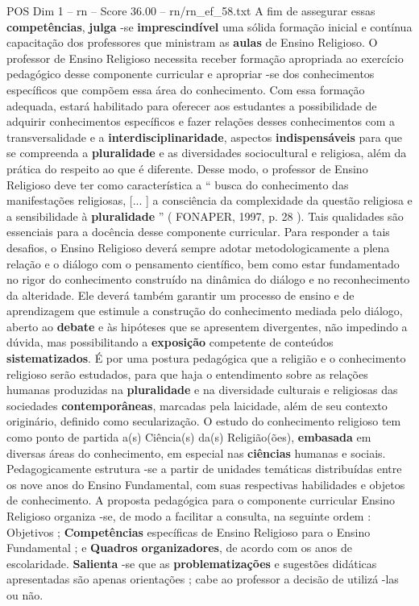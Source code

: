 \begin{textsample}{POS Dim 1 – rn – Score 36.00 – rn/rn\_ef\_58.txt}
A fim de assegurar essas \textbf{competências}, \textbf{julga} -se \textbf{imprescindível} uma sólida formação inicial e contínua capacitação dos professores que ministram as \textbf{aulas} de Ensino Religioso.
O professor de Ensino Religioso necessita receber formação apropriada ao exercício pedagógico desse componente curricular e apropriar -se dos conhecimentos específicos que compõem essa área do conhecimento.
Com essa formação adequada, estará habilitado para oferecer aos estudantes a possibilidade de adquirir conhecimentos específicos e fazer relações desses conhecimentos com a transversalidade e a \textbf{interdisciplinaridade}, aspectos \textbf{indispensáveis} para que se compreenda a \textbf{pluralidade} e as diversidades sociocultural e religiosa, além da prática do respeito ao que é diferente.
Desse modo, o professor de Ensino Religioso deve ter como característica a “ busca do conhecimento das manifestações religiosas, [... ] a consciência da complexidade da questão religiosa e a sensibilidade à \textbf{pluralidade} ” ( FONAPER, 1997, p. 28 ).
Tais qualidades são essenciais para a docência desse componente curricular.
Para responder a tais desafios, o Ensino Religioso deverá sempre adotar metodologicamente a plena relação e o diálogo com o pensamento científico, bem como estar fundamentado no rigor do conhecimento construído na dinâmica do diálogo e no reconhecimento da alteridade.
Ele deverá também garantir um processo de ensino e de aprendizagem que estimule a construção do conhecimento mediada pelo diálogo, aberto ao \textbf{debate} e às hipóteses que se apresentem divergentes, não impedindo a dúvida, mas possibilitando a \textbf{exposição} competente de conteúdos \textbf{sistematizados}.
É por uma postura pedagógica que a religião e o conhecimento religioso serão estudados, para que haja o entendimento sobre as relações humanas produzidas na \textbf{pluralidade} e na diversidade culturais e religiosas das sociedades \textbf{contemporâneas}, marcadas pela laicidade, além de seu contexto originário, definido como secularização.
O estudo do conhecimento religioso tem como ponto de partida a(s) Ciência(s) da(s) Religião(ões), \textbf{embasada} em diversas áreas do conhecimento, em especial nas \textbf{ciências} humanas e sociais.
Pedagogicamente estrutura -se a partir de unidades temáticas distribuídas entre os nove anos do Ensino Fundamental, com suas respectivas habilidades e objetos de conhecimento.
A proposta pedagógica para o componente curricular Ensino Religioso organiza -se, de modo a facilitar a consulta, na seguinte ordem : Objetivos ; \textbf{Competências} específicas de Ensino Religioso para o Ensino Fundamental ; e \textbf{Quadros} \textbf{organizadores}, de acordo com os anos de escolaridade. \textbf{Salienta} -se que as \textbf{problematizações} e sugestões didáticas apresentadas são apenas orientações ; cabe ao professor a decisão de utilizá -las ou não.

\end{textsample}
